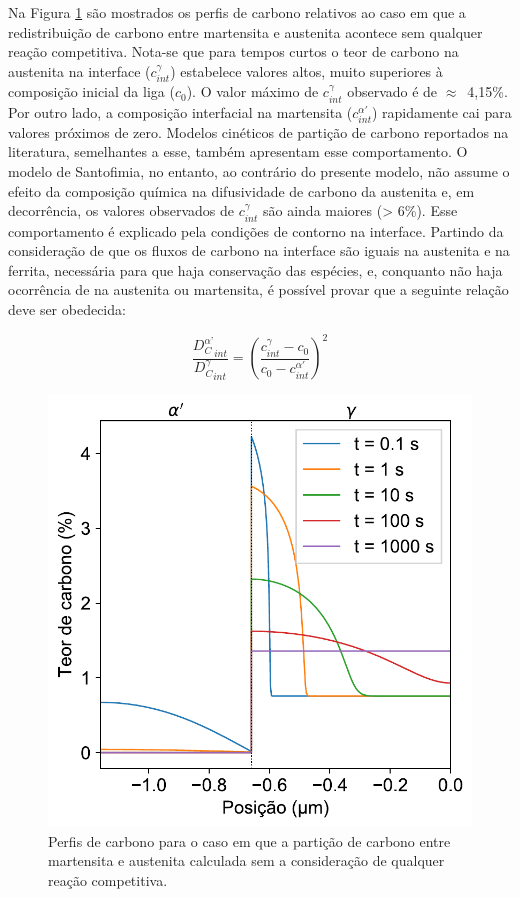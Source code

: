 Na Figura \ref{fig:cprofiles_sem_reacoes} são mostrados os perfis de carbono relativos ao caso em que a redistribuição de carbono entre martensita e austenita acontece sem qualquer reação competitiva. Nota-se que para tempos curtos o teor de carbono na austenita na interface ($c^\gamma_{int}$) estabelece valores altos, muito superiores à composição inicial da liga ($c_0$). O valor máximo de $c^\gamma_{int}$ observado é de $\approx$~4,15\%. Por outro lado, a composição interfacial na martensita ($c^{\alpha'}_{int}$) rapidamente cai para valores próximos de zero. Modelos cinéticos de partição de carbono reportados na literatura, semelhantes a esse, também apresentam esse comportamento\cite{Santofimia2008,Santofimia2009}. O modelo de Santofimia, no entanto, ao contrário do presente modelo, não assume o efeito da composição química na difusividade de carbono da austenita e, em decorrência, os valores observados de $c^\gamma_{int}$ são ainda maiores (> 6\%). Esse comportamento é explicado pela condições de contorno na interface. Partindo da consideração de que os fluxos de carbono na interface são iguais na austenita e na ferrita, necessária para que haja conservação das espécies, e, conquanto não haja ocorrência de 
na austenita ou martensita, é possível provar que a seguinte relação deve ser obedecida:

\begin{equation}
  \frac{{D_C^{\alpha\text{'}}}_{int}}{{D_C^\gamma}_{int}} = \left(\frac{c^\gamma_{int} - c_0}{c_0 - c^{\alpha'}_{int}}\right)^2
  \label{eq:conservacao_interface}
\end{equation}

\begin{figure}
  \includegraphics[width=.6\textwidth]{img/cpartition/cprofiles/mart_FoFo_CCE.pdf}
  \caption{Perfis de carbono para o caso em que a partição de carbono entre martensita e austenita calculada sem a consideração de qualquer reação competitiva.}
  \label{fig:cprofiles_sem_reacoes}
\end{figure}

